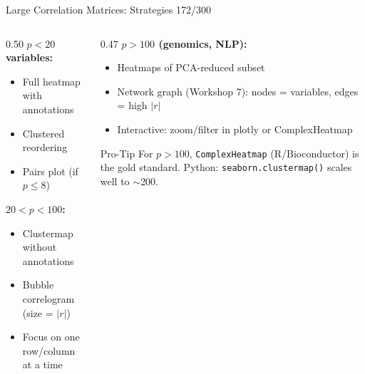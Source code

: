 \documentclass[10pt]{beamer}
\newcommand{\smark}[1]{\hfill{\scriptsize\color{codegray}#1}}
\begin{document}
\begin{frame}{Large Correlation Matrices: Strategies}
\smark{172/300}
\begin{columns}[T]
\begin{column}{0.50\textwidth}
    \textbf{$p < 20$ variables:}
    \begin{itemize}
        \item Full heatmap with annotations
        \item Clustered reordering
        \item Pairs plot (if $p \leq 8$)
    \end{itemize}
    \vspace{0.2cm}
    \textbf{$20 < p < 100$:}
    \begin{itemize}
        \item Clustermap without annotations
        \item Bubble correlogram (size = $|r|$)
        \item Focus on one row/column at a time
    \end{itemize}
\end{column}
\begin{column}{0.47\textwidth}
    \textbf{$p > 100$ (genomics, NLP):}
    \begin{itemize}
        \item Heatmaps of PCA-reduced subset
        \item Network graph (Workshop 7): nodes = variables, edges = high $|r|$
        \item Interactive: zoom/filter in plotly or ComplexHeatmap
    \end{itemize}
    \vspace{0.1cm}
    \begin{alertblock}{Pro-Tip}
        \scriptsize For $p > 100$, \texttt{ComplexHeatmap} (R/Bioconductor) is the gold standard. Python: \texttt{seaborn.clustermap()} scales well to $\sim$200.
    \end{alertblock}
\end{column}
\end{columns}
\end{frame}
\end{document}
